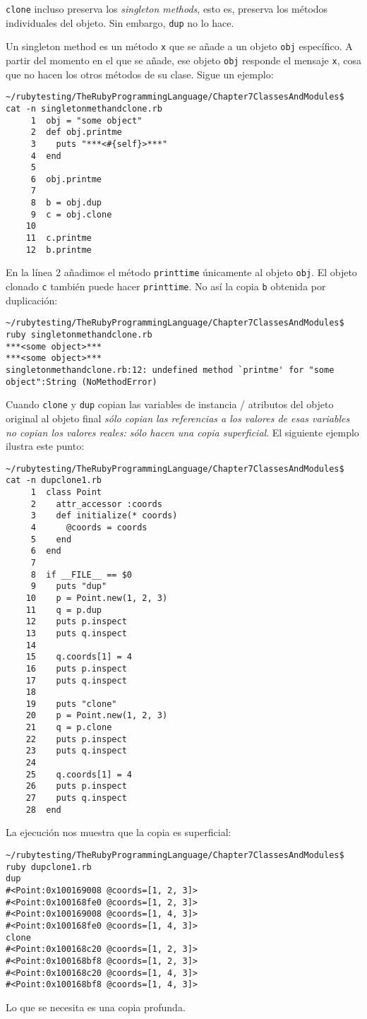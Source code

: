 \verb|clone| incluso preserva los {\it singleton methods}, esto es, preserva los métodos individuales
del objeto. Sin embargo, \verb|dup| no lo hace.

Un singleton method es un método \verb|x| que se añade a un objeto \verb|obj|
específico. A partir del momento en el que se añade, ese objeto \verb|obj|
responde el mensaje \verb|x|, cosa que no hacen los otros métodos de su clase.
Sigue un ejemplo:
\begin{verbatim}
~/rubytesting/TheRubyProgrammingLanguage/Chapter7ClassesAndModules$ cat -n singletonmethandclone.rb 
     1  obj = "some object"
     2  def obj.printme
     3    puts "***<#{self}>***"
     4  end
     5  
     6  obj.printme
     7  
     8  b = obj.dup
     9  c = obj.clone
    10  
    11  c.printme
    12  b.printme
\end{verbatim}
En la línea 2 añadimos el método \verb|printtime| únicamente al objeto \verb|obj|. El objeto clonado
\verb|c| también puede hacer \verb|printtime|. No así la copia \verb|b| obtenida por duplicación:
\begin{verbatim}
~/rubytesting/TheRubyProgrammingLanguage/Chapter7ClassesAndModules$ ruby singletonmethandclone.rb 
***<some object>***
***<some object>***
singletonmethandclone.rb:12: undefined method `printme' for "some object":String (NoMethodError)
\end{verbatim}

Cuando \verb|clone| y \verb|dup| copian las variables de instancia / atributos del objeto original al objeto final
\emph{sólo copian las referencias a los valores de esas variables no copian los valores reales: sólo hacen una copia superficial}.
El siguiente ejemplo ilustra este punto:

\begin{verbatim}
~/rubytesting/TheRubyProgrammingLanguage/Chapter7ClassesAndModules$ cat -n dupclone1.rb 
     1  class Point
     2    attr_accessor :coords
     3    def initialize(* coords)
     4      @coords = coords
     5    end
     6  end
     7  
     8  if __FILE__ == $0
     9    puts "dup"
    10    p = Point.new(1, 2, 3)
    11    q = p.dup
    12    puts p.inspect
    13    puts q.inspect
    14  
    15    q.coords[1] = 4
    16    puts p.inspect
    17    puts q.inspect
    18  
    19    puts "clone"
    20    p = Point.new(1, 2, 3)
    21    q = p.clone
    22    puts p.inspect
    23    puts q.inspect
    24  
    25    q.coords[1] = 4
    26    puts p.inspect
    27    puts q.inspect
    28  end
\end{verbatim}
La ejecución nos muestra que la copia es superficial:
\begin{verbatim}
~/rubytesting/TheRubyProgrammingLanguage/Chapter7ClassesAndModules$ ruby dupclone1.rb 
dup
#<Point:0x100169008 @coords=[1, 2, 3]>
#<Point:0x100168fe0 @coords=[1, 2, 3]>
#<Point:0x100169008 @coords=[1, 4, 3]>
#<Point:0x100168fe0 @coords=[1, 4, 3]>
clone
#<Point:0x100168c20 @coords=[1, 2, 3]>
#<Point:0x100168bf8 @coords=[1, 2, 3]>
#<Point:0x100168c20 @coords=[1, 4, 3]>
#<Point:0x100168bf8 @coords=[1, 4, 3]>
\end{verbatim}
Lo que se necesita es una copia profunda.

